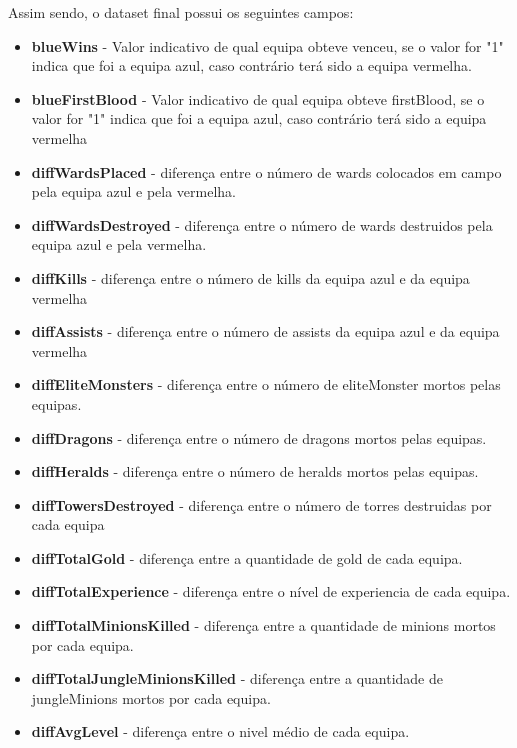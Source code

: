 Assim sendo, o dataset final possui os seguintes campos:
\begin{itemize}
    \item \textbf{blueWins} - Valor indicativo de qual equipa obteve venceu, se o valor for "1" indica que foi a equipa azul, caso contrário terá sido a equipa vermelha.
    \item \textbf{blueFirstBlood} - Valor indicativo de qual equipa obteve \gls{firstBlood}, se o valor for "1" indica que foi a equipa azul, caso contrário terá sido a equipa vermelha
    \item \textbf{diffWardsPlaced} - diferença entre o número de \gls{wards} colocados em campo pela equipa azul e pela vermelha.
    \item \textbf{diffWardsDestroyed} - diferença entre o número de \gls{wards} destruidos pela equipa azul e pela vermelha.
    \item \textbf{diffKills} - diferença entre o número de \gls{kills} da equipa azul e da equipa vermelha
    \item \textbf{diffAssists} - diferença entre o número de \gls{assists} da equipa azul e da equipa vermelha
    \item \textbf{diffEliteMonsters} - diferença entre o número de \gls{eliteMonster} mortos pelas equipas.
    \item \textbf{diffDragons} - diferença entre o número de \gls{dragons} mortos pelas equipas.
    \item \textbf{diffHeralds} - diferença entre o número de \gls{heralds} mortos pelas equipas.
    \item \textbf{diffTowersDestroyed} - diferença entre o número de \gls{torres} destruidas por cada equipa
    \item \textbf{diffTotalGold} - diferença entre a quantidade de \gls{gold} de cada equipa.
    \item \textbf{diffTotalExperience} - diferença entre o nível de \gls{experiencia} de cada equipa.
    \item \textbf{diffTotalMinionsKilled} - diferença entre a quantidade de \gls{minions} mortos por cada equipa.
    \item \textbf{diffTotalJungleMinionsKilled} - diferença entre a quantidade de \gls{jungleMinions} mortos por cada equipa.
    \item \textbf{diffAvgLevel} - diferença entre o \gls{nivel} médio de cada equipa.
\end{itemize}